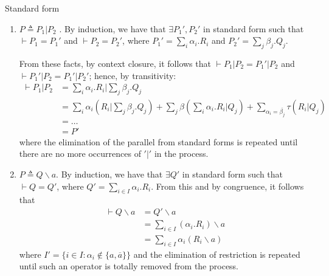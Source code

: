 \begin{Lemma}{Standard form}{}
\begin{demonstration}
\begin{itemize}
\begin{enumerate}
            We can repeat this reasoning until we obtain
            \begin{equation*}
                \vdash \sum_{i \in I}\alpha_i.P_i = \sum_{i \in I}\alpha_i.P_i'
            \end{equation*}

            \item $P\triangleq P_1 | P_2$ . By induction, we have that $\exists P_1', P_2'$ in standard form such that $\vdash P_1 = P_1'$ and $\vdash P_2 = P_2'$, where $P_1'=\sum_i\alpha_i.R_i$ and $P_2'=\sum_j\beta_j.Q_j$.
            
            From these facts, by context closure, it follows that $\vdash P_1|P_2 = P_1'|P_2$ and $\vdash P_1' | P_2 = P_1'|P_2'$; hence, by transitivity:
            \begin{align*}
                \vdash P_1 | P_2 &= \sum_i\alpha_i.R_i|\sum_j\beta_j.Q_j\\
                &= \sum_i\alpha_i(R_i|\sum_j\beta_j.Q_j) + \sum_j\beta(\sum_i\alpha_i.R_i|Q_j) + \sum_{\alpha_i = \overline{\beta_j}}\tau (R_i|Q_j)\\
                &=\ldots\\
                &=P'
            \end{align*}
            where the elimination of the parallel from standard forms is repeated until there are no more occurrences of $'|'$ in the process.
            \item $P \triangleq Q\backslash a$. By induction, we have that $\exists Q'$ in standard form such that $\vdash Q = Q'$, where $Q' = \sum_{i \in I}\alpha_i.R_i$. From this and by congruence, it follows that
            \begin{align*}
                \vdash Q\backslash a &= Q'\backslash a\\
                &=\sum_{i \in I}(\alpha_i.R_i)\backslash a\\
                &=\sum_{i \in I}\alpha_i(R_i\backslash a)
            \end{align*}
            where $I' = \{i \in I : \alpha_i \notin \{a, \overline{a}\}\}$ and the elimination of restriction is repeated until such an operator is totally removed from the process.
        \end{enumerate}
    \end{itemize}
    \end{demonstration}
\end{Lemma}

